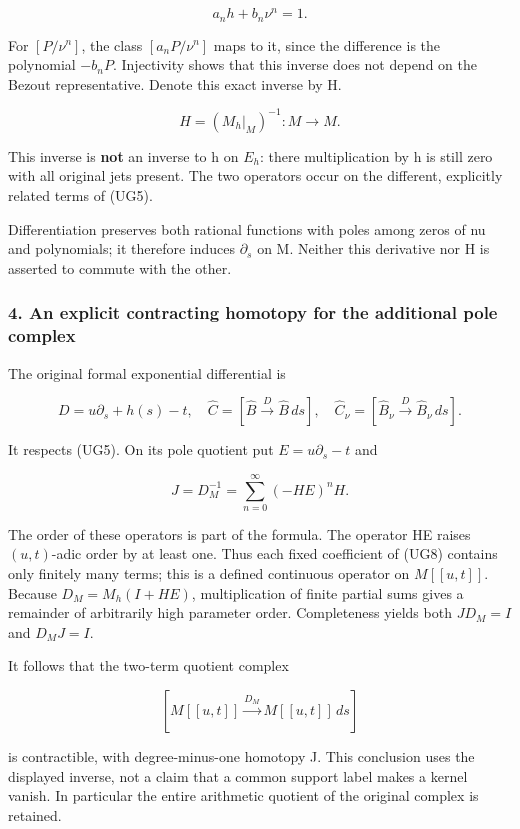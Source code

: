 \[
a_n h+b_n\nu^n=1.
\]

For \([P/\nu^n]\), the class \([a_n P/\nu^n]\) maps to it, since the difference is the polynomial \(-b_n P\). Injectivity shows that this inverse does not depend on the Bezout representative. Denote this exact inverse by H.

\[
H=(M_h|_M)^{-1}:M\longrightarrow M.
\tag{UG6}
\]

This inverse is \textbf{not} an inverse to h on \(E_h\): there multiplication by h is still zero with all original jets present. The two operators occur on the different, explicitly related terms of (UG5).

Differentiation preserves both rational functions with poles among zeros of nu and polynomials; it therefore induces \(\partial_s\) on M. Neither this derivative nor H is asserted to commute with the other.

\subsubsection{4. An explicit contracting homotopy for the additional pole complex}\label{endpoint-f1_unit_gauge--an-explicit-contracting-homotopy-for-the-additional-pole-complex}

The original formal exponential differential is

\[
D=u\partial_s+h(s)-t,
\quad\widehat C=[\widehat B\xrightarrow D\widehat B\,ds],
\quad\widehat C_\nu=[\widehat B_\nu\xrightarrow D\widehat B_\nu\,ds].
\tag{UG7}
\]

It respects (UG5). On its pole quotient put \(E=u\partial_s-t\) and

\[
\boxed{J=D_M^{-1}=\sum_{n=0}^\infty(-HE)^nH.}
\tag{UG8}
\]

The order of these operators is part of the formula. The operator HE raises \((u,t)\)-adic order by at least one. Thus each fixed coefficient of (UG8) contains only finitely many terms; this is a defined continuous operator on \(M[[u,t]]\). Because \(D_M=M_h(I+HE)\), multiplication of finite partial sums gives a remainder of arbitrarily high parameter order. Completeness yields both \(J D_M=I\) and \(D_M J=I\).

It follows that the two-term quotient complex

\[
[M[[u,t]]\xrightarrow{D_M}M[[u,t]]\,ds]
\tag{UG9}
\]

is contractible, with degree-minus-one homotopy J. This conclusion uses the displayed inverse, not a claim that a common support label makes a kernel vanish. In particular the entire arithmetic quotient of the original complex is retained.

